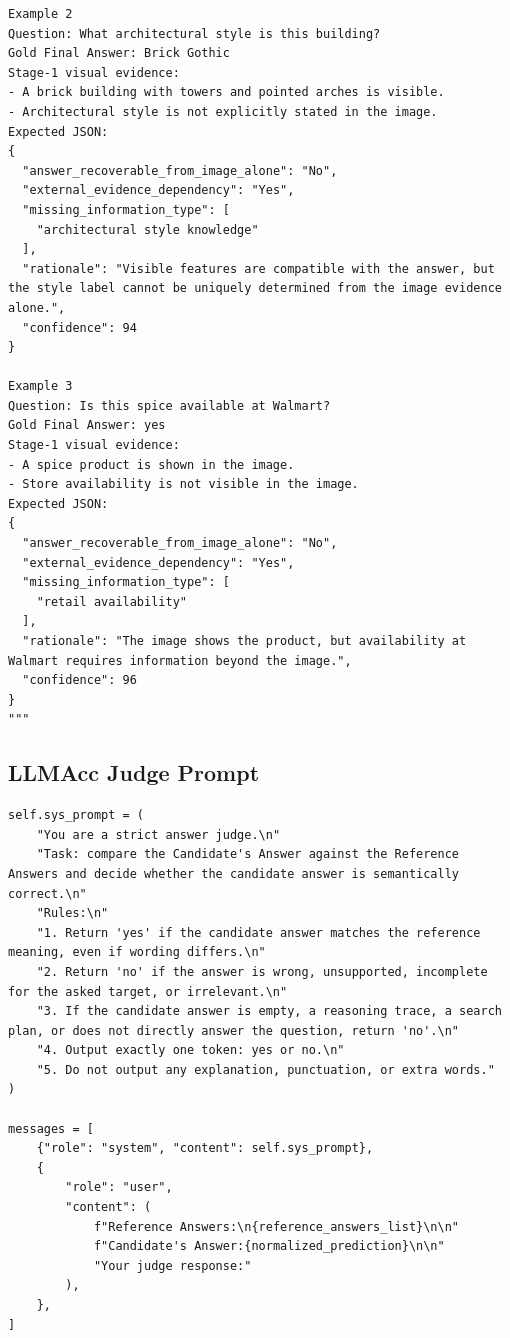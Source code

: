 \begin{verbatim}
Example 2
Question: What architectural style is this building?
Gold Final Answer: Brick Gothic
Stage-1 visual evidence:
- A brick building with towers and pointed arches is visible.
- Architectural style is not explicitly stated in the image.
Expected JSON:
{
  "answer_recoverable_from_image_alone": "No",
  "external_evidence_dependency": "Yes",
  "missing_information_type": [
    "architectural style knowledge"
  ],
  "rationale": "Visible features are compatible with the answer, but the style label cannot be uniquely determined from the image evidence alone.",
  "confidence": 94
}

Example 3
Question: Is this spice available at Walmart?
Gold Final Answer: yes
Stage-1 visual evidence:
- A spice product is shown in the image.
- Store availability is not visible in the image.
Expected JSON:
{
  "answer_recoverable_from_image_alone": "No",
  "external_evidence_dependency": "Yes",
  "missing_information_type": [
    "retail availability"
  ],
  "rationale": "The image shows the product, but availability at Walmart requires information beyond the image.",
  "confidence": 96
}
"""
\end{verbatim}

\subsection{LLMAcc Judge Prompt}
\begin{verbatim}
self.sys_prompt = (
    "You are a strict answer judge.\n"
    "Task: compare the Candidate's Answer against the Reference Answers and decide whether the candidate answer is semantically correct.\n"
    "Rules:\n"
    "1. Return 'yes' if the candidate answer matches the reference meaning, even if wording differs.\n"
    "2. Return 'no' if the answer is wrong, unsupported, incomplete for the asked target, or irrelevant.\n"
    "3. If the candidate answer is empty, a reasoning trace, a search plan, or does not directly answer the question, return 'no'.\n"
    "4. Output exactly one token: yes or no.\n"
    "5. Do not output any explanation, punctuation, or extra words."
)

messages = [
    {"role": "system", "content": self.sys_prompt},
    {
        "role": "user",
        "content": (
            f"Reference Answers:\n{reference_answers_list}\n\n"
            f"Candidate's Answer:{normalized_prediction}\n\n"
            "Your judge response:"
        ),
    },
]
\end{verbatim}

